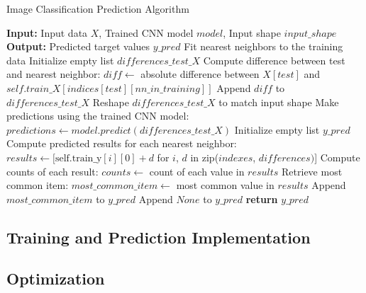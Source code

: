 \documentclass[a4paper, 12pt]{report}
\begin{document}
\begin{algorithm}
    \caption{Image Classification Prediction Algorithm}
    \label{alg:image_classification_final_prediction}
    \begin{algorithmic}[1]
            \State \textbf{Input:} Input data $X$, Trained CNN model $model$, Input shape $input\_shape$
            \State \textbf{Output:} Predicted target values $y\_pred$
            \State Fit nearest neighbors to the training data
            \State Initialize empty list $differences\_test\_X$
             
                    \State Compute difference between test and nearest neighbor: 
                    \State \quad $diff \gets$ absolute difference between $X[test]$ and $self.train\_X[indices[test][nn\_in\_training]]$
                    \State Append $diff$ to $differences\_test\_X$
                \EndFor
            \EndFor
            \State Reshape $differences\_test\_X$ to match input shape
            \State Make predictions using the trained CNN model: $predictions \gets model.predict(differences\_test\_X)$
            \State Initialize empty list $y\_pred$
                \State Compute predicted results for each nearest neighbor:
                \State \quad $results \gets [\text{self.train\_y}[i][0] + d$ for $i$, $d$ in zip($indexes$, $differences)$]
                \State Compute counts of each result: $counts \gets$ count of each value in $results$
                \State Retrieve most common item: $most\_common\_item \gets$ most common value in $results$
                    \State Append $most\_common\_item$ to $y\_pred$
                \Else
                    \State Append $None$ to $y\_pred$ 
                \EndIf
            \EndFor
            \State \textbf{return} $y\_pred$
        \EndFunction
    \end{algorithmic}
\end{algorithm}
\subsection{Training and Prediction Implementation}
\subsection{Optimization}
\end{document}
